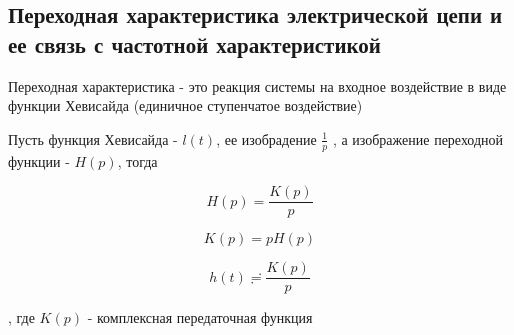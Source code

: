 \subsection{Переходная характеристика электрической цепи и ее связь с частотной характеристикой}


Переходная характеристика - это реакция системы на входное воздействие в виде функции Хевисайда (единичное ступенчатое воздействие)

Пусть функция Хевисайда - $l(t)$, ее изобрадение $ \frac{1}{p}$ , а изображение переходной функции - $H(p)$, тогда

\begin{equation}
H(p) = \frac{K(p)}{p}
\end{equation} 

\begin{equation}
K(p) = p H(p)
\end{equation}


\begin{equation}
h(t) \risingdotseq  \frac{K(p)}{p}
\end{equation}

, где $K(p)$ - комплексная передаточная функция


\pagebreak

